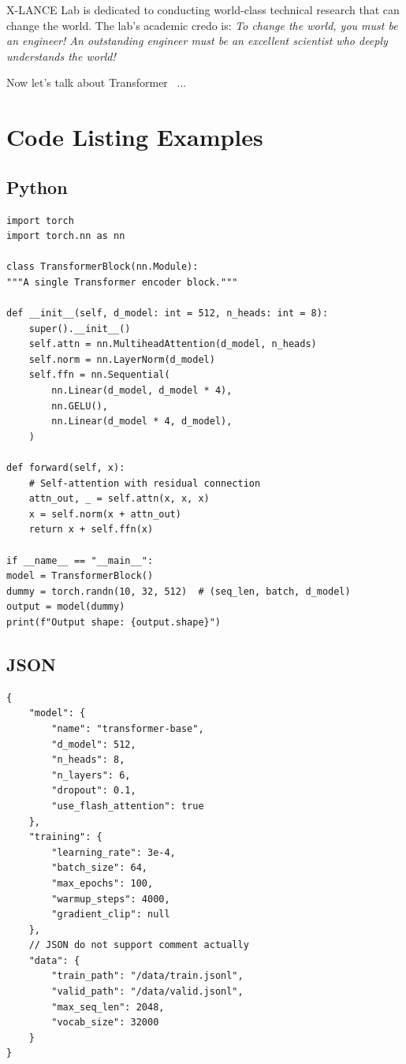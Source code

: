 \documentclass[opendfm]{xlance/xlance}
\begin{document}
X-LANCE Lab is dedicated to conducting world-class technical research that can change the world. The lab’s academic credo is: \textit{To change the world, you must be an engineer! An outstanding engineer must be an excellent scientist who deeply understands the world!}

Now let's talk about Transformer~\cite{vaswani2017attention} ...


\section{Code Listing Examples}
\label{section:listings}

\subsection{Python}

\begin{lstlisting}[style=python, caption={A Python code example}]
import torch
import torch.nn as nn

class TransformerBlock(nn.Module):
"""A single Transformer encoder block."""

def __init__(self, d_model: int = 512, n_heads: int = 8):
    super().__init__()
    self.attn = nn.MultiheadAttention(d_model, n_heads)
    self.norm = nn.LayerNorm(d_model)
    self.ffn = nn.Sequential(
        nn.Linear(d_model, d_model * 4),
        nn.GELU(),
        nn.Linear(d_model * 4, d_model),
    )

def forward(self, x):
    # Self-attention with residual connection
    attn_out, _ = self.attn(x, x, x)
    x = self.norm(x + attn_out)
    return x + self.ffn(x)

if __name__ == "__main__":
model = TransformerBlock()
dummy = torch.randn(10, 32, 512)  # (seq_len, batch, d_model)
output = model(dummy)
print(f"Output shape: {output.shape}")
\end{lstlisting}

\subsection{JSON}

\begin{lstlisting}[style=json, caption={A JSON configuration example}]
{
    "model": {
        "name": "transformer-base",
        "d_model": 512,
        "n_heads": 8,
        "n_layers": 6,
        "dropout": 0.1,
        "use_flash_attention": true
    },
    "training": {
        "learning_rate": 3e-4,
        "batch_size": 64,
        "max_epochs": 100,
        "warmup_steps": 4000,
        "gradient_clip": null
    },
    // JSON do not support comment actually
    "data": {
        "train_path": "/data/train.jsonl",
        "valid_path": "/data/valid.jsonl",
        "max_seq_len": 2048,
        "vocab_size": 32000
    }
}
\end{lstlisting}
\end{document}
